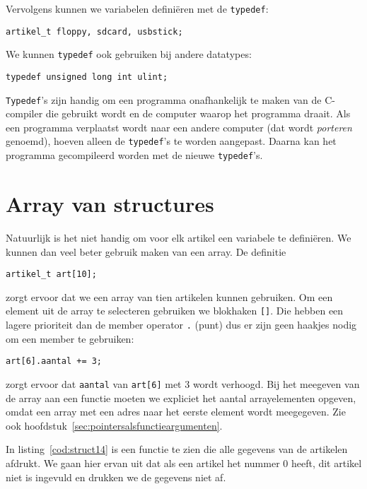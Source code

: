
Vervolgens kunnen we variabelen definiëren met de \texttt{typedef}:

\hspace*{1em}\texttt{artikel\_t floppy, sdcard, usbstick;}

We kunnen \texttt{typedef} ook gebruiken bij andere datatypes:

\hspace*{1em}\texttt{typedef unsigned long int ulint;}

\texttt{Typedef}'s zijn handig om een programma onafhankelijk te maken van de C-compiler die gebruikt wordt en de computer waarop het programma draait. Als een programma verplaatst wordt naar een andere computer (dat wordt \textsl{porteren} genoemd), hoeven alleen de \texttt{typedef}'s te worden aangepast. Daarna kan het programma gecompileerd worden met de nieuwe \texttt{typedef}'s.


\section{Array van structures}
Natuurlijk is het niet handig om voor elk artikel een variabele te definiëren. We kunnen dan veel beter gebruik maken van een array. De definitie

\hspace*{1em}\texttt{artikel\_t art[10];}

zorgt ervoor dat we een array van tien artikelen kunnen gebruiken. Om een element uit de array te selecteren gebruiken we blokhaken \texttt{[]}. Die hebben een lagere prioriteit dan de member operator \texttt{.} (punt) dus er zijn geen haakjes nodig om een member te gebruiken:

\hspace*{1em}\texttt{art[6].aantal += 3;}

zorgt ervoor dat \texttt{aantal} van \texttt{art[6]} met 3 wordt verhoogd. Bij het meegeven van de array aan een functie moeten we expliciet het aantal arrayelementen opgeven, omdat een array met een adres naar het eerste element wordt meegegeven. Zie ook hoofdstuk~\ref{sec:pointersalsfunctieargumenten}.

In listing~\ref{cod:struct14} is een functie te zien die alle gegevens van de artikelen afdrukt. We gaan hier ervan uit dat als een artikel het nummer 0 heeft, dit artikel niet is ingevuld en drukken we de gegevens niet af. 

